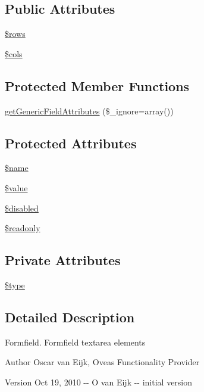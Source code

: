 \subsection*{Public Attributes}
\begin{DoxyCompactItemize}
\item 
\hyperlink{classFormFieldTextarea_ab3a8058daa4c23d597e4003366075b59}{\$rows}
\item 
\hyperlink{classFormFieldTextarea_a70b12469646211ddd78d187269604fd4}{\$cols}
\end{DoxyCompactItemize}
\subsection*{Protected Member Functions}
\begin{DoxyCompactItemize}
\item 
\hyperlink{classFormField_a9f9d136ba8b4a793f22370aff43d592d}{getGenericFieldAttributes} (\$\_\-ignore=array())
\end{DoxyCompactItemize}
\subsection*{Protected Attributes}
\begin{DoxyCompactItemize}
\item 
\hyperlink{classFormField_a23861f707bcd77bbace6300de9621746}{\$name}
\item 
\hyperlink{classFormField_a3c01e89834248eec8e2f145fbcfa0fbc}{\$value}
\item 
\hyperlink{classFormField_ab6f1907061890290e32cb2befc0a5f50}{\$disabled}
\item 
\hyperlink{classFormField_a78ba5d4b9127e75e8ccf86f397b5d9ac}{\$readonly}
\end{DoxyCompactItemize}
\subsection*{Private Attributes}
\begin{DoxyCompactItemize}
\item 
\hyperlink{classFormFieldTextarea_a85348034822c70694fc8640bfcacc04d}{\$type}
\end{DoxyCompactItemize}


\subsection{Detailed Description}
Formfield. Formfield textarea elements \begin{DoxyAuthor}{Author}
Oscar van Eijk, Oveas Functionality Provider 
\end{DoxyAuthor}
\begin{DoxyVersion}{Version}
Oct 19, 2010 -\/-\/ O van Eijk -\/-\/ initial version 
\end{DoxyVersion}



